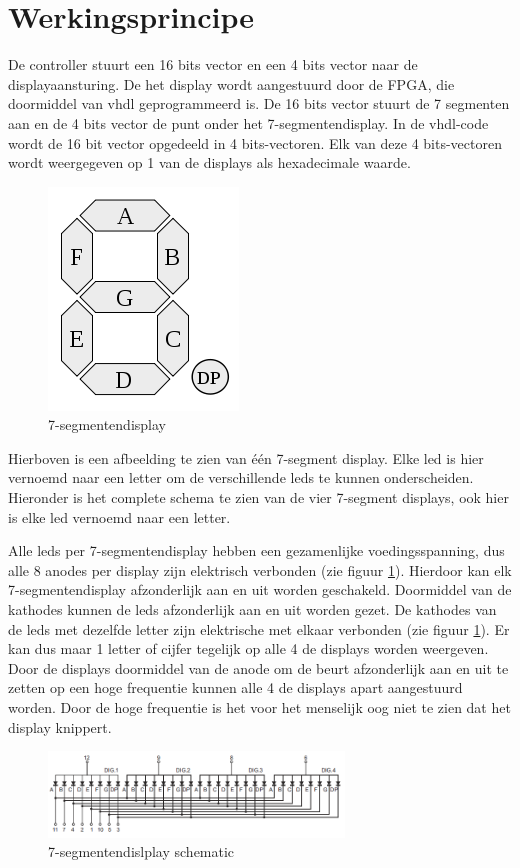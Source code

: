 \documentclass{report}
\begin{document}
\section{Werkingsprincipe}
De controller stuurt een 16 bits vector en een 4 bits vector naar de displayaansturing.
De het display wordt aangestuurd door de FPGA, die doormiddel van vhdl geprogrammeerd is.
De 16 bits vector stuurt de 7 segmenten aan en de 4 bits vector de punt onder het 7-segmentendisplay.
In de vhdl-code wordt de 16 bit vector opgedeeld in 4 bits-vectoren.
Elk van deze 4 bits-vectoren wordt weergegeven op 1 van de displays als hexadecimale waarde.
\begin{figure}[H]
\centering
\includegraphics{7_segment_display.png}

\caption{7-segmentendisplay}
\end{figure}
Hierboven is een afbeelding te zien van \'{e}\'{e}n 7-segment display.
Elke led is hier vernoemd naar een letter om de verschillende leds te kunnen onderscheiden.
Hieronder is het complete schema te zien van de vier 7-segment displays, ook hier is elke led vernoemd naar een letter.

Alle leds per 7-segmentendisplay hebben een gezamenlijke voedingsspanning, dus alle 8 anodes per display zijn elektrisch verbonden (zie figuur \ref{fig:ssegschematic}).
Hierdoor kan elk 7-segmentendisplay afzonderlijk aan en uit worden geschakeld.
Doormiddel van de kathodes kunnen de leds afzonderlijk aan en uit worden gezet.
De kathodes van de leds met dezelfde letter zijn elektrische met elkaar verbonden (zie figuur \ref{fig:ssegschematic}).
Er kan dus maar 1 letter of cijfer tegelijk op alle 4 de displays worden weergeven.
Door de displays doormiddel van de anode om de beurt afzonderlijk aan en uit te zetten op een hoge frequentie kunnen alle 4 de displays apart aangestuurd worden.
Door de hoge frequentie is het voor het menselijk oog niet te zien dat het display knippert.
\begin{figure}[H]
\centering
\label{fig:ssegschematic}
\includegraphics[width=0.7\textwidth]{7_segment_display_schematic.png}

\caption{7-segmentendislplay schematic}
\end{figure}
\end{document}
